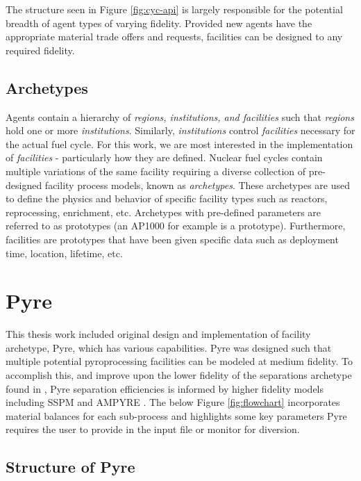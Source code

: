 The structure seen in Figure \ref{fig:cyc-api} is largely responsible for the potential breadth of agent types of varying fidelity. Provided new agents have the appropriate material trade offers and requests,
facilities can be designed to any required fidelity.

\subsection{Archetypes}

Agents contain a hierarchy of \emph{regions, institutions, and facilities} such that \emph{regions} hold one or more \emph{institutions}. Similarly, \emph{institutions}
control \emph{facilities} necessary for the actual fuel cycle. For this work, we are most interested in the implementation of \emph{facilities} - particularly how they are defined.
Nuclear fuel cycles contain multiple variations of the same facility requiring a diverse collection of pre-designed facility process models, known as \emph{archetypes}.
These archetypes are used to define the physics and behavior of specific facility types such as reactors, reprocessing, enrichment, etc. Archetypes with pre-defined parameters are referred
to as prototypes (an AP1000 for example is a prototype). Furthermore, facilities are prototypes that have been given specific data such as deployment time, location, lifetime, etc.

\section{Pyre}

This thesis work included original design and implementation of \Cyclus facility archetype, Pyre, which has various capabilities. Pyre was designed such that multiple potential pyroprocessing facilities can be modeled at medium fidelity. To accomplish this, and improve upon
the lower fidelity of the separations archetype found in \Cycamore, Pyre separation efficiencies is informed by higher fidelity models including SSPM and AMPYRE \cite{cipiti_modeling_2012,maggos_update_2015}. The below Figure \ref{fig:flowchart} incorporates material balances for each sub-process and highlights some key parameters Pyre
requires the user to provide in the input file or monitor for diversion.

\subsection{Structure of Pyre}


